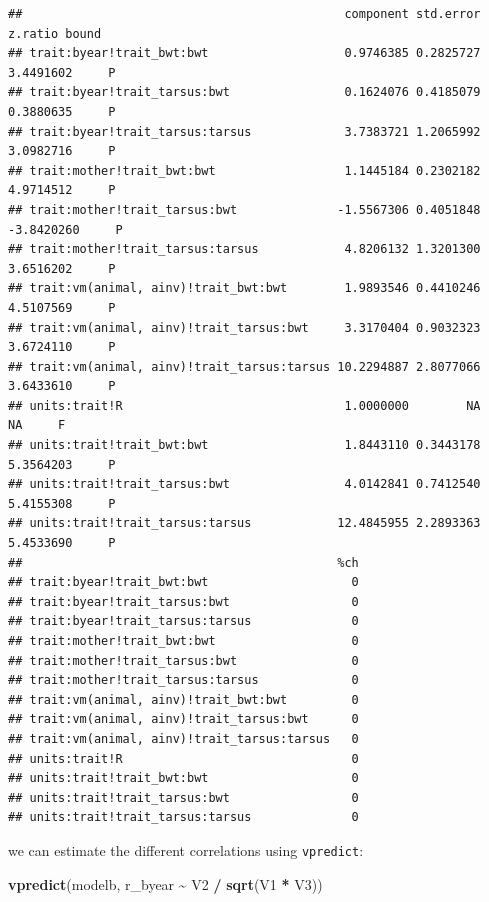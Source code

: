 \documentclass[
  12pt,
]{book}
\newenvironment{Shaded}{\begin{snugshade}}{\end{snugshade}}
\newcommand{\KeywordTok}[1]{\textcolor[rgb]{0.13,0.29,0.53}{\textbf{#1}}}
\newcommand{\NormalTok}[1]{#1}
\newcommand{\OperatorTok}[1]{\textcolor[rgb]{0.81,0.36,0.00}{\textbf{#1}}}
\newcommand{\StringTok}[1]{\textcolor[rgb]{0.31,0.60,0.02}{#1}}
\begin{document}
\begin{verbatim}
##                                             component std.error    z.ratio bound
## trait:byear!trait_bwt:bwt                   0.9746385 0.2825727  3.4491602     P
## trait:byear!trait_tarsus:bwt                0.1624076 0.4185079  0.3880635     P
## trait:byear!trait_tarsus:tarsus             3.7383721 1.2065992  3.0982716     P
## trait:mother!trait_bwt:bwt                  1.1445184 0.2302182  4.9714512     P
## trait:mother!trait_tarsus:bwt              -1.5567306 0.4051848 -3.8420260     P
## trait:mother!trait_tarsus:tarsus            4.8206132 1.3201300  3.6516202     P
## trait:vm(animal, ainv)!trait_bwt:bwt        1.9893546 0.4410246  4.5107569     P
## trait:vm(animal, ainv)!trait_tarsus:bwt     3.3170404 0.9032323  3.6724110     P
## trait:vm(animal, ainv)!trait_tarsus:tarsus 10.2294887 2.8077066  3.6433610     P
## units:trait!R                               1.0000000        NA         NA     F
## units:trait!trait_bwt:bwt                   1.8443110 0.3443178  5.3564203     P
## units:trait!trait_tarsus:bwt                4.0142841 0.7412540  5.4155308     P
## units:trait!trait_tarsus:tarsus            12.4845955 2.2893363  5.4533690     P
##                                            %ch
## trait:byear!trait_bwt:bwt                    0
## trait:byear!trait_tarsus:bwt                 0
## trait:byear!trait_tarsus:tarsus              0
## trait:mother!trait_bwt:bwt                   0
## trait:mother!trait_tarsus:bwt                0
## trait:mother!trait_tarsus:tarsus             0
## trait:vm(animal, ainv)!trait_bwt:bwt         0
## trait:vm(animal, ainv)!trait_tarsus:bwt      0
## trait:vm(animal, ainv)!trait_tarsus:tarsus   0
## units:trait!R                                0
## units:trait!trait_bwt:bwt                    0
## units:trait!trait_tarsus:bwt                 0
## units:trait!trait_tarsus:tarsus              0
\end{verbatim}

we can estimate the different correlations using \texttt{vpredict}:

\begin{Shaded}
\begin{Highlighting}[]
\KeywordTok{vpredict}\NormalTok{(modelb, r\_byear }\OperatorTok{\textasciitilde{}}\StringTok{ }\NormalTok{V2 }\OperatorTok{/}\StringTok{ }\KeywordTok{sqrt}\NormalTok{(V1 }\OperatorTok{*}\StringTok{ }\NormalTok{V3))}
\end{Highlighting}
\end{Shaded}
\end{document}
